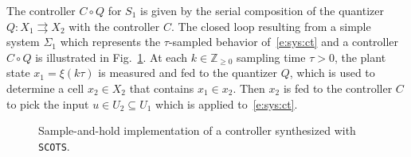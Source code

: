 \documentclass[a4paper]{amsart}
\newcommand{\segcc}[1]{\ensuremath{{\left\llbracket#1\right\rrbracket}}}
\newcommand{\Z}{\mathbb{Z}}
\begin{document}
The controller $C\circ Q$ for $S_1$ is given by the serial composition of the quantizer
$Q:X_1\rightrightarrows X_2$ with the controller $C$. 
The closed loop resulting from a simple system $\Sigma_1$ which represents the $\tau$-sampled
behavior of~\eqref{e:sys:ct} and a controller $C\circ Q$ is illustrated
in Fig.~\ref{f:closedloop}. At each $k\in\Z_{\ge0}$ sampling
time $\tau>0$, the plant state $x_1=\xi(k\tau)$ is measured and fed to the
quantizer $Q$, which is used to determine a cell $x_2\in X_2$ that contains
$x_1\in x_2$. Then $x_2$ is fed to the controller $C$ to pick the input $u\in
U_2\subseteq U_1$ which is applied to~\eqref{e:sys:ct}.
\begin{figure}[h]
  \centering
\caption{Sample-and-hold implementation of a controller synthesized with {\tt SCOTS}.}\label{f:closedloop}
\end{figure}

%
\end{document}
